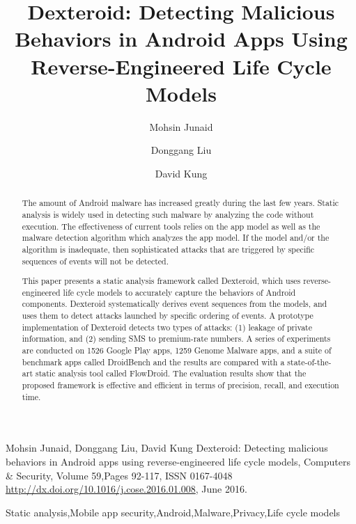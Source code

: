 \documentclass[10pt]{elsarticle}
\date{}
\begin{document}
\begin{frontmatter}

\title{Dexteroid: Detecting Malicious Behaviors in Android Apps Using Reverse-Engineered Life Cycle Models}

\maketitle
Mohsin Junaid, Donggang Liu, David Kung Dexteroid: Detecting malicious behaviors in Android apps using reverse-engineered life cycle models, Computers \& Security, Volume 59,Pages 92-117, ISSN 0167-4048 \url{http://dx.doi.org/10.1016/j.cose.2016.01.008}, June 2016.

 \author{Mohsin Junaid}
  \author{Donggang Liu}
   \author{David Kung}
 \address{Department of Computer Science and Engineering, University of Texas at Arlington, Arlington, United States}



\begin{abstract}

The amount of Android malware has increased greatly during the last few years. Static analysis is widely used in detecting such malware by analyzing the code without execution. The effectiveness of current tools relies on the app model as well as the malware detection algorithm which analyzes the app model. If the model and/or the algorithm is inadequate, then sophisticated attacks that are triggered by specific sequences of events will not be detected.

This paper presents a static analysis framework called Dexteroid, which uses reverse-engineered life cycle models to accurately capture the behaviors of Android components. Dexteroid systematically derives event sequences from the models, and uses them to detect attacks launched by specific ordering of events. A prototype implementation of Dexteroid detects two types of attacks: (1) leakage of private information, and (2) sending SMS to premium-rate numbers. A series of experiments are conducted on 1526 Google Play apps, 1259 Genome Malware apps, and a suite of benchmark apps called DroidBench and the results are compared with a state-of-the-art static analysis tool called FlowDroid. The evaluation results show that the proposed framework is effective and efficient in terms of precision, recall, and execution time.


\end{abstract}

\begin{keyword} Static analysis\sep Mobile app security\sep Android\sep Malware\sep Privacy\sep Life cycle models
 
\end{keyword}

\end{frontmatter}
\end{document}
